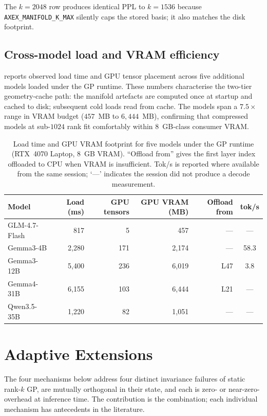 \documentclass[11pt]{article}
\begin{document}
The $k{=}2048$ row produces identical PPL to $k{=}1536$ because
\texttt{AXEX\_MANIFOLD\_K\_MAX} silently caps the stored basis; it
also matches the disk footprint.

\subsection{Cross-model load and VRAM efficiency}
 reports observed load time and GPU tensor placement
across five additional models loaded under the GP runtime.  These numbers
characterise the two-tier geometry-cache path: the manifold artefacts
are computed once at startup and cached to disk; subsequent cold loads
read from cache.  The models span a $7.5\times$ range in VRAM budget
($457$~MB to $6{,}444$~MB), confirming that compressed models at
sub-$1024$ rank fit comfortably within 8~GB-class consumer VRAM.

\begin{table}[h]\centering\small
\caption{Load time and GPU VRAM footprint for five models under the GP
runtime (RTX~4070 Laptop, 8~GB VRAM).  ``Offload from'' gives the
first layer index offloaded to CPU when VRAM is insufficient.
Tok/s is reported where available from the same session; `---'
indicates the session did not produce a decode measurement.}
\label{tab:load-vram}
\begin{tabular}{@{}lrrrrc@{}}
\toprule
Model & Load (ms) & GPU tensors & GPU VRAM (MB) & Offload from & tok/s \\
\midrule
GLM-4.7-Flash          & 817   & 5   & 457   & ---  & --- \\
Gemma3-4B              & 2{,}280 & 171 & 2{,}174 & ---  & 58.3 \\
Gemma3-12B             & 5{,}400 & 236 & 6{,}019 & L47  & 3.8  \\
Gemma4-31B             & 6{,}155 & 103 & 6{,}444 & L21  & --- \\
Qwen3.5-35B            & 1{,}220 & 82  & 1{,}051 & ---  & --- \\
\bottomrule
\end{tabular}
\end{table}

\section*{Adaptive Extensions}

The four mechanisms below address four distinct invariance failures of
static rank-$k$ GP, are mutually orthogonal in their state, and each is
zero- or near-zero-overhead at inference time.  The contribution is the
combination; each individual mechanism has antecedents in the
literature.
\end{document}
